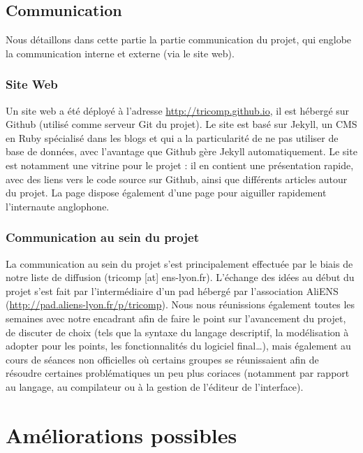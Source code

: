 \documentclass{article}
\begin{document}
\subsection{Communication}

Nous détaillons dans cette partie la partie communication du projet,
qui englobe la communication interne et externe (via le site web).

\subsubsection{Site Web}

Un site web a été déployé à l'adresse \url{http://tricomp.github.io}, il est hébergé
sur Github (utilisé comme serveur Git du projet). Le site est basé sur Jekyll, un 
CMS en Ruby spécialisé dans les blogs et qui a la particularité de ne pas utiliser 
de base de données, avec l'avantage que Github gère Jekyll automatiquement. Le site 
est notamment une vitrine pour le projet : il en contient une présentation rapide, 
avec des liens vers le code source sur Github, ainsi que différents articles autour du projet.
La page dispose également d'une page pour aiguiller rapidement l'internaute anglophone.


\subsubsection{Communication au sein du projet}

La communication au sein du projet s'est principalement effectuée par le biais de notre liste
de diffusion (tricomp [at] ens-lyon.fr). L'échange des idées au début du projet s'est 
fait par l'intermédiaire d'un pad hébergé par l'association AliENS (\url{http://pad.aliens-lyon.fr/p/tricomp}). 
Nous nous réunissions également toutes les semaines avec notre encadrant afin de faire le point 
sur l'avancement du projet, de discuter de choix (tels que la syntaxe du langage descriptif, 
la modélisation à adopter pour les points, les fonctionnalités du logiciel final\dots), mais 
également au cours de séances non officielles où certains groupes se réunissaient 
afin de résoudre certaines problématiques un peu plus coriaces (notamment par rapport au langage, 
au compilateur ou à la gestion de l'éditeur de l'interface).

\section{Améliorations possibles}
\end{document}
